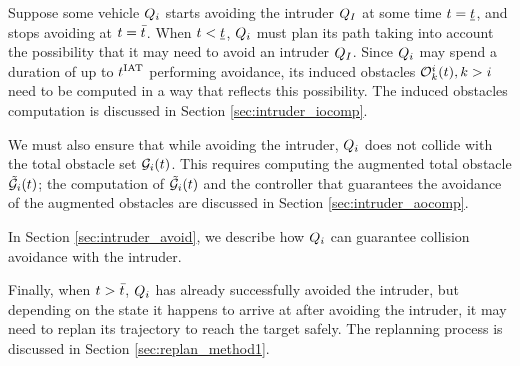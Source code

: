 Suppose some vehicle $Q_i$ starts avoiding the intruder $Q_{I}$ at some time $t = \underline{t}$, and stops avoiding at $t = \bar{t}$. When $t < \underline{t}$, $Q_i$ must plan its path taking into account the possibility that it may need to avoid an intruder $Q_I$. Since $Q_i$ may spend a duration of up to $t^\text{IAT}$ performing avoidance, its induced obstacles $\mathcal{O}_k^i(t), k>i$ need to be computed in a way that reflects this possibility. The induced obstacles computation is discussed in Section \ref{sec:intruder_iocomp}.

We must also ensure that while avoiding the intruder, $Q_i$ does not collide with the total obstacle set $\mathcal{G}_i(t)$. This requires computing the augmented total obstacle $\tilde{\mathcal{G}}_i(t)$; the computation of $\tilde{\mathcal{G}}_i(t)$ and the controller that guarantees the avoidance of the augmented obstacles are discussed in Section \ref{sec:intruder_aocomp}.

In Section \ref{sec:intruder_avoid}, we describe how $Q_i$ can guarantee collision avoidance with the intruder.

Finally, when $t > \bar{t}$, $Q_i$ has already successfully avoided the intruder, but depending on the state it happens to arrive at after avoiding the intruder, it may need to replan its trajectory to reach the target safely. The replanning process is discussed in Section \ref{sec:replan_method1}.

